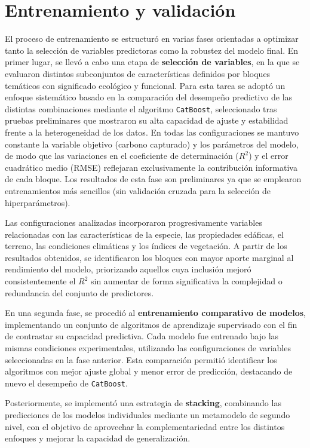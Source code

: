\section{Entrenamiento y validación}
\label{sec:entrenamiento}

El proceso de entrenamiento se estructuró en varias fases orientadas a optimizar tanto la selección de variables predictoras como la robustez del modelo final. En primer lugar, se llevó a cabo una etapa de \textbf{selección de variables}, en la que se evaluaron distintos subconjuntos de características definidos por bloques temáticos con significado ecológico y funcional. Para esta tarea se adoptó un enfoque sistemático basado en la comparación del desempeño predictivo de las distintas combinaciones mediante el algoritmo \texttt{CatBoost}, seleccionado tras pruebas preliminares que mostraron su alta capacidad de ajuste y estabilidad frente a la heterogeneidad de los datos. En todas las configuraciones se mantuvo constante la variable objetivo (carbono capturado) y los parámetros del modelo, de modo que las variaciones en el coeficiente de determinación ($R^2$) y el error cuadrático medio (RMSE) reflejaran exclusivamente la contribución informativa de cada bloque. Los resultados de esta fase son preliminares ya que se emplearon entrenamientos más sencillos (sin validación cruzada para la selección de hiperparámetros).

Las configuraciones analizadas incorporaron progresivamente variables relacionadas con las características de la especie, las propiedades edáficas, el terreno, las condiciones climáticas y los índices de vegetación. A partir de los resultados obtenidos, se identificaron los bloques con mayor aporte marginal al rendimiento del modelo, priorizando aquellos cuya inclusión mejoró consistentemente el $R^2$ sin aumentar de forma significativa la complejidad o redundancia del conjunto de predictores.

En una segunda fase, se procedió al \textbf{entrenamiento comparativo de modelos}, implementando un conjunto de algoritmos de aprendizaje supervisado con el fin de contrastar su capacidad predictiva. Cada modelo fue entrenado bajo las mismas condiciones experimentales, utilizando las configuraciones de variables seleccionadas en la fase anterior. Esta comparación permitió identificar los algoritmos con mejor ajuste global y menor error de predicción, destacando de nuevo el desempeño de \texttt{CatBoost}.

Posteriormente, se implementó una estrategia de \textbf{stacking}, combinando las predicciones de los modelos individuales mediante un metamodelo de segundo nivel, con el objetivo de aprovechar la complementariedad entre los distintos enfoques y mejorar la capacidad de generalización.


